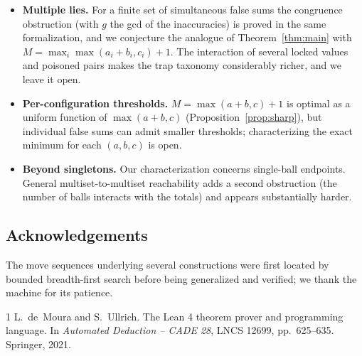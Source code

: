 \documentclass[11pt]{article}
\theoremstyle{definition}
\theoremstyle{remark}
\begin{document}
\begin{itemize}
\item \textbf{Multiple lies.}  For a finite set of simultaneous false sums
the congruence obstruction (with $g$ the gcd of the inaccuracies) is proved
in the same formalization, and we conjecture the analogue of
Theorem~\ref{thm:main} with $M=\max_i\max(a_i+b_i,c_i)+1$.
The interaction of several locked values and poisoned pairs makes the
trap taxonomy considerably richer, and we leave it open.
\item \textbf{Per-configuration thresholds.}  $M=\max(a+b,c)+1$ is optimal as
a uniform function of $\max(a+b,c)$ (Proposition~\ref{prop:sharp}), but individual
false sums can admit smaller thresholds; characterizing the exact minimum
for each $(a,b,c)$ is open.
\item \textbf{Beyond singletons.}  Our characterization concerns
single-ball endpoints.  General multiset-to-multiset reachability adds a
second obstruction (the number of balls interacts with the totals) and
appears substantially harder.
\end{itemize}

\subsection*{Acknowledgements}
The move sequences underlying several constructions were first located by
bounded breadth-first search before being generalized and verified; we
thank the machine for its patience.

\begin{thebibliography}{1}
L.~de~Moura and S.~Ullrich.
\newblock The {Lean} 4 theorem prover and programming language.
\newblock In \emph{Automated Deduction -- CADE 28}, LNCS 12699, pp.~625--635.
Springer, 2021.
\end{thebibliography}
\end{document}
